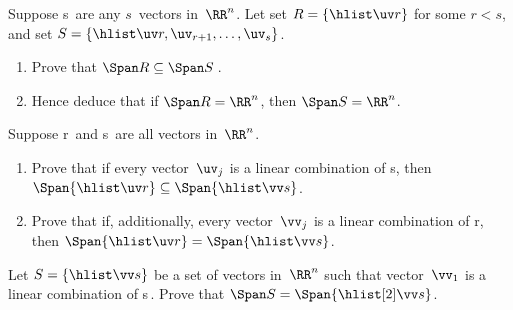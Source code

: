 \begin{exercise} \label{ex:} 
Suppose \hlist\uv s\ are any \(s\)~vectors in~\(\RR^n\).
Let set \(R=\{\hlist\uv r\}\) for some \(r<s\), and set \(S=\{\hlist\uv r,\uv_{r+1},\ldots,\uv_s\}\).
\begin{enumerate}
\item Prove that \(\Span R\subseteq\Span S\)\,.
\item Hence deduce that if \(\Span R=\RR^n\), then \(\Span S=\RR^n\).
\end{enumerate}
\end{exercise}




\begin{exercise} \label{ex:} 
Suppose \hlist\uv r\ and \hlist\vv s\ are all vectors in~\(\RR^n\).
\begin{enumerate}
\item Prove that if every vector~\(\uv_j\) is a linear combination of \hlist\vv s, then \(\Span\{\hlist\uv r\}\subseteq\Span\{\hlist\vv s\}\).
\item  Prove that if, additionally, every vector~\(\vv_j\) is a linear combination of \hlist\uv r, then \(\Span\{\hlist\uv r\}=\Span\{\hlist\vv s\}\).
\end{enumerate}
\end{exercise}





\begin{exercise} \label{ex:} 
Let \(S=\{\hlist\vv s\}\) be a set of vectors in~\(\RR^n\) such that vector~\(\vv_1\) is a linear combination of \hlist[2]\vv s\,.  
Prove that \(\Span S=\Span\{\hlist[2]\vv s\}\).
\end{exercise}







\begin{comment}%
why, what caused X?
how did X occur?
what-if? what-if-not?
how does X compare with Y?
what is the evidence for X?
why is X important?
\end{comment}



